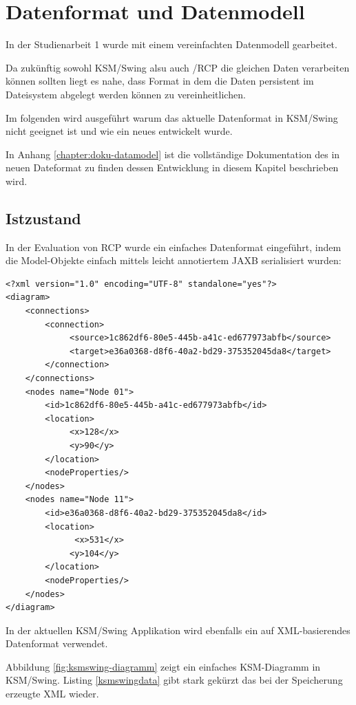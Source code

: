 \documentclass[%
12pt,titlepage,abstracton]{scrreprt}
\begin{document}
\chapter{Datenformat und Datenmodell}
In der Studienarbeit 1 wurde mit einem vereinfachten Datenmodell gearbeitet.

Da zukünftig sowohl KSM/Swing alsu auch /RCP die gleichen Daten verarbeiten
können sollten liegt es nahe, dass Format in dem die Daten persistent im
Dateisystem abgelegt werden können zu vereinheitlichen.

Im folgenden wird ausgeführt warum das aktuelle Datenformat in KSM/Swing nicht
geeignet ist und wie ein neues entwickelt wurde.

\par
\begingroup
\leftskip=1.5cm %
\noindent In Anhang \ref{chapter:doku-datamodel} ist die vollständige Dokumentation des
in neuen Dateformat zu finden dessen Entwicklung in diesem Kapitel beschrieben
wird.
\par
\endgroup

\section{Istzustand}
In der Evaluation von RCP wurde ein einfaches Datenformat eingeführt, indem die
Model-Objekte einfach mittels leicht annotiertem JAXB serialisiert wurden:
{\small
\begin{verbatim}
<?xml version="1.0" encoding="UTF-8" standalone="yes"?>
<diagram>
    <connections>
        <connection>
             <source>1c862df6-80e5-445b-a41c-ed677973abfb</source>
             <target>e36a0368-d8f6-40a2-bd29-375352045da8</target>
        </connection>
    </connections>
    <nodes name="Node 01">
        <id>1c862df6-80e5-445b-a41c-ed677973abfb</id>
        <location>
             <x>128</x>
             <y>90</y>
        </location>
        <nodeProperties/>
    </nodes>
    <nodes name="Node 11">
        <id>e36a0368-d8f6-40a2-bd29-375352045da8</id>
        <location>
              <x>531</x>
             <y>104</y>
        </location>
        <nodeProperties/>
    </nodes>
</diagram>
\end{verbatim}
}

In der aktuellen KSM/Swing Applikation wird ebenfalls ein auf XML-basierendes
Datenformat verwendet.

Abbildung \ref{fig:ksmswing-diagramm} zeigt ein einfaches KSM-Diagramm in
KSM/Swing. Listing \ref{ksmswingdata} gibt stark gekürzt das bei der Speicherung
erzeugte XML wieder.
\end{document}
